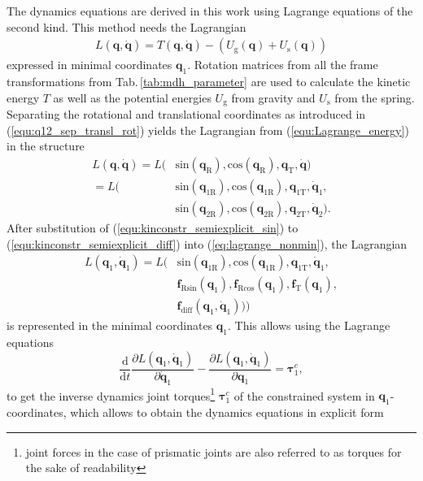 \documentclass[twocolumn,10pt]{IFTOMM}
\newcommand{\bm}[1]{\boldsymbol{#1}}
\begin{document}
The dynamics equations are derived in this work using Lagrange equations of the second kind. This method needs the Lagrangian 
%
\begin{align}
L(\bm{q},\dot{\bm{q}}) = T(\bm{q},\dot{\bm{q}})-(U_{\mathrm{g}}(\bm{q})+U_{\mathrm{s}}(\bm{q}))
\label{equ:Lagrange_energy}
\end{align}
%
expressed in minimal coordinates $\bm{q}_{1}$.
Rotation matrices from all the frame transformations from Tab.\,\ref{tab:mdh_parameter} are used to calculate the kinetic energy $T$ as well as the potential energies $U_{\mathrm{g}}$ from gravity and $U_{\mathrm{s}}$ from the spring.
Separating the rotational and translational coordinates as introduced in (\ref{equ:q12_sep_transl_rot}) yields the Lagrangian from (\ref{equ:Lagrange_energy}) in the structure
%
\begin{align}
L(\bm{q},\dot{\bm{q}}) =L( & \mathrm{sin}  (\bm{q}_{\mathrm{R}}),\mathrm{cos}(\bm{q}_{\mathrm{R}}), \bm{q}_{\mathrm{T}},\dot{\bm{q}}) \\\label{eq:lagrange_nonmin}
=L( & \mathrm{sin}  (\bm{q}_{1\mathrm{R}}),\mathrm{cos}(\bm{q}_{1\mathrm{R}}), \bm{q}_{1\mathrm{T}},\dot{\bm{q}}_{1}, \nonumber \\
& \mathrm{sin}  (\bm{q}_{2\mathrm{R}}),\mathrm{cos}(\bm{q}_{2\mathrm{R}}), \bm{q}_{2\mathrm{T}},\dot{\bm{q}}_{2}).
\end{align}
%
After substitution of (\ref{equ:kinconstr_semiexplicit_sin}) to (\ref{equ:kinconstr_semiexplicit_diff}) into (\ref{eq:lagrange_nonmin}), the Lagrangian 
%
\begin{align}
L(\bm{q}_1,\dot{\bm{q}}_1)=L( & \mathrm{sin} (\bm{q}_{1\mathrm{R}}),\mathrm{cos}(\bm{q}_{1\mathrm{R}}), \bm{q}_{1\mathrm{T}},\dot{\bm{q}}_{1}, \\
 & \bm{f}_{\mathrm{R}\mathrm{sin}}(\bm{q}_1),
\bm{f}_{\mathrm{R}\mathrm{cos}}(\bm{q}_1),
\bm{f}_{\mathrm{T}}(\bm{q}_1),\\
& \bm{f}_{\mathrm{diff}}(\bm{q}_1,\dot{\bm{q}}_1))) \nonumber
\end{align}
%
is represented in the minimal coordinates $\bm{q}_1$.
This allows using the Lagrange equations
%
\begin{equation}
\frac{\mathrm{d}}{{\mathrm{d}}t}\frac{\partial L(\bm{q}_1,\dot{\bm{q}}_1)}{\partial \dot{\bm{q}}_1} - \frac{\partial L(\bm{q}_1,\dot{\bm{q}}_1)}{\partial \bm{q}_1}= \bm{\tau}^c_1,
\end{equation}
%
to get the inverse dynamics joint torques\footnote{joint forces in the case of prismatic joints are also referred to as torques for the sake of readability} $\bm{\tau}^c_1$ of the constrained system in $\bm{q}_1$-coordinates, which allows to obtain the dynamics equations in explicit form
\end{document}
